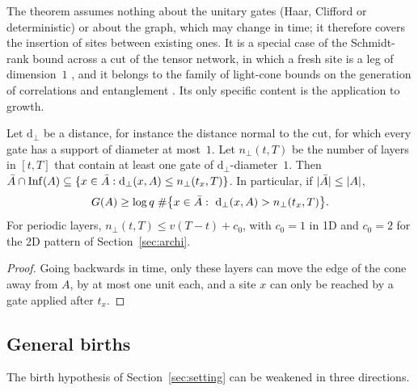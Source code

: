 \begin{remark}[scope]
The theorem assumes nothing about the unitary gates (Haar, Clifford or deterministic) or about the graph, which may change in time; it therefore covers the insertion of sites between existing ones. It is a special case of the Schmidt-rank bound across a cut of the tensor network, in which a fresh site is a leg of dimension~$1$ \cite{Hayden2016,NRVH2017}, and it belongs to the family of light-cone bounds on the generation of correlations and entanglement \cite{BHV2006,EisertOsborne2006,Bravyi2007}. Its only specific content is the application to growth.
\end{remark}

\begin{corollary}\label{cor:geo}
Let $\mathrm d_\perp$ be a distance, for instance the distance normal to the cut, for which every gate has a support of diameter at most~$1$. Let $n_\perp(t,T)$ be the number of layers in $[t,T]$ that contain at least one gate of $\mathrm d_\perp$-diameter~$1$. Then $\bar A\cap\mathrm{Inf}(A)\subseteq\{x\in\bar A:\mathrm d_\perp(x,A)\le n_\perp(t_x,T)\}$. In particular, if $|\bar A|\le|A|$,
\begin{equation}\label{eq:geo}
G(A)\ge\log q\;\#\big\{x\in\bar A:\ \mathrm d_\perp(x,A)>n_\perp(t_x,T)\big\}.
\end{equation}
For periodic layers, $n_\perp(t,T)\le v(T-t)+c_0$, with $c_0=1$ in 1D and $c_0=2$ for the 2D pattern of Section~\ref{sec:archi}.
\end{corollary}
\begin{proof}
Going backwards in time, only these layers can move the edge of the cone away from $A$, by at most one unit each, and a site $x$ can only be reached by a gate applied after $t_x$.
\end{proof}

\subsection{General births}\label{sec:births}

The birth hypothesis of Section~\ref{sec:setting} can be weakened in three directions.

